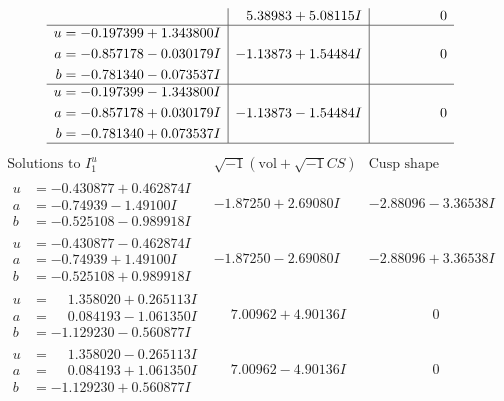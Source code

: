\documentclass[1p]{elsarticle_modified}
\theoremstyle{definition}
\newcommand{\I}{\sqrt{-1}}
\begin{document}
$$\begin{array}{c|c|c}
 & \phantom{-}5.38983 + 5.08115 I & \phantom{-0.000000 } 0 \\ \hline\begin{aligned}
u &= -0.197399 + 1.343800 I \\
a &= -0.857178 - 0.030179 I \\
b &= -0.781340 - 0.073537 I\end{aligned}
 & -1.13873 + 1.54484 I & \phantom{-0.000000 } 0 \\ \hline\begin{aligned}
u &= -0.197399 - 1.343800 I \\
a &= -0.857178 + 0.030179 I \\
b &= -0.781340 + 0.073537 I\end{aligned}
 & -1.13873 - 1.54484 I & \phantom{-0.000000 } 0\\
 \hline 
 \end{array}$$\newpage$$\begin{array}{c|c|c}  
\text{Solutions to }I^u_{1}& \I (\text{vol} + \sqrt{-1}CS) & \text{Cusp shape}\\
 \hline 
\begin{aligned}
u &= -0.430877 + 0.462874 I \\
a &= -0.74939 - 1.49100 I \\
b &= -0.525108 - 0.989918 I\end{aligned}
 & -1.87250 + 2.69080 I & -2.88096 - 3.36538 I \\ \hline\begin{aligned}
u &= -0.430877 - 0.462874 I \\
a &= -0.74939 + 1.49100 I \\
b &= -0.525108 + 0.989918 I\end{aligned}
 & -1.87250 - 2.69080 I & -2.88096 + 3.36538 I \\ \hline\begin{aligned}
u &= \phantom{-}1.358020 + 0.265113 I \\
a &= \phantom{-}0.084193 - 1.061350 I \\
b &= -1.129230 - 0.560877 I\end{aligned}
 & \phantom{-}7.00962 + 4.90136 I & \phantom{-0.000000 } 0 \\ \hline\begin{aligned}
u &= \phantom{-}1.358020 - 0.265113 I \\
a &= \phantom{-}0.084193 + 1.061350 I \\
b &= -1.129230 + 0.560877 I\end{aligned}
 & \phantom{-}7.00962 - 4.90136 I & \phantom{-0.000000 } 0 \\ \hline\begin{aligned}

\end{aligned}
\end{array}$$
\end{document}
